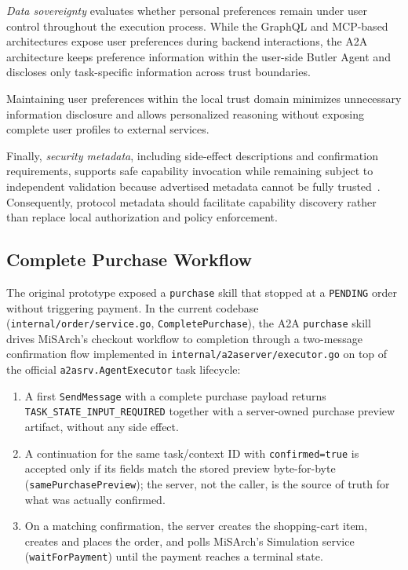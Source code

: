 \documentclass[conference]{IEEEtran}
\begin{document}
\emph{Data sovereignty} evaluates whether personal preferences remain under
user control throughout the execution process. While the GraphQL and
MCP-based architectures expose user preferences during backend interactions,
the A2A architecture keeps preference information within the user-side
Butler Agent and discloses only task-specific information across trust
boundaries.

Maintaining user preferences within the local trust domain minimizes
unnecessary information disclosure and allows personalized reasoning without
exposing complete user profiles to external services.

Finally, \emph{security metadata}, including side-effect descriptions and
confirmation requirements, supports safe capability invocation while
remaining subject to independent validation because advertised metadata
cannot be fully trusted~\cite{ref5,ref6}. Consequently, protocol metadata
should facilitate capability discovery rather than replace local
authorization and policy enforcement.

\subsection{Complete Purchase Workflow}
\label{sec:purchase}

The original prototype exposed a \texttt{purchase} skill that stopped at a
\texttt{PENDING} order without triggering payment. In the current codebase
(\texttt{internal/order/service.go}, \texttt{CompletePurchase}), the A2A
\texttt{purchase} skill drives MiSArch's checkout workflow to completion
through a two-message confirmation flow implemented in
\texttt{internal/a2aserver/executor.go} on top of the official
\texttt{a2asrv.AgentExecutor} task lifecycle:

\begin{enumerate}
\item A first \texttt{SendMessage} with a complete purchase payload returns
  \texttt{TASK\_STATE\_INPUT\_REQUIRED} together with a server-owned purchase
  preview artifact, without any side effect.
\item A continuation for the same task/context ID with \texttt{confirmed=true}
  is accepted only if its fields match the stored preview
  byte-for-byte (\texttt{samePurchasePreview}); the server, not the caller,
  is the source of truth for what was actually confirmed.
\item On a matching confirmation, the server creates the shopping-cart item,
  creates and places the order, and polls MiSArch's Simulation service
  (\texttt{waitForPayment}) until the payment reaches a terminal state.
\end{enumerate}
\end{document}
